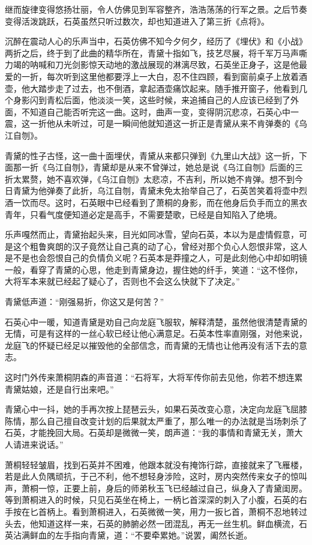 继而旋律变得悠扬壮丽，令人仿佛见到军容整齐，浩浩荡荡的行军之景。之后节奏变得活泼跳跃，石英虽然只听过数次，却也知道进入了第三折《点将》。

沉醉在震动人心的乐声当中，石英仿佛不知今夕何夕，经历了《埋伏》和《小战》两折之后，终于到了此曲的精华所在，青黛十指如飞，技艺尽展，将千军万马声嘶力竭的呐喊和刀光剑影惊天动地的激战展现的淋漓尽致，石英坐正身子，这是他最爱的一折，每次听到这里他都要浮上一大白，忍不住四顾，看到窗前桌子上放着酒壶，他大踏步走了过去，也不倒酒，拿起酒壶痛饮起来。随手推开窗子，他看到几个身影闪到青松后面，他淡淡一笑，这些时候，来追捕自己的人应该已经到了外面，不知道自己能否听完这一曲。这时，曲声一变，变得阴沉悲凉，石英心中一震，这一折他从未听过，可是一瞬间他就知道这一折正是青黛从来不肯弹奏的《乌江自刎》。

青黛的性子古怪，这一曲十面埋伏，青黛从来都只弹到《九里山大战》这一折，下面那一折《乌江自刎》，青黛却是从来不曾弹过，她总是说《乌江自刎》后面的三折太累赘，她不喜欢弹，《乌江自刎》太悲凉，不吉利，所以她不肯弹。想不到今日青黛为他弹奏了此折，乌江自刎，青黛未免太抬举自己了，石英苦笑着将壶中烈酒一饮而尽。这时，石英眼中已经看到了萧桐的身影，而在他身后负手而立的黑衣青年，只看气度便知道必定是高手，不需要楚歌，已经是自知陷入了绝境。

乐声嘎然而止，青黛抬起头来，目光如同冰雪，望向石英，本以为是虚情假意，可是这个粗鲁爽朗的汉子竟然让自己真的动了心，曾经对那个负心人怨恨非常，这人是不是也会怨恨自己的负情负义呢？石英本是莽撞之人，可是此刻他心中却如明镜一般，看穿了青黛的心思，他走到青黛身边，握住她的纤手，笑道：“这不怪你，大将军本来就已经起了疑心了，否则也不会这么快就下了决定。”

青黛低声道：“刚强易折，你这又是何苦？”

石英心中一暖，知道青黛是劝自己向龙庭飞服软，解释清楚，虽然他很清楚青黛的无情，可是有这样的一丝心软已经让他心满意足。石英本性率直刚强，对他来说，龙庭飞的怀疑已经足以摧毁他的全部信念，而青黛的无情也让他再没有活下去的意志。

这时门外传来萧桐阴森的声音道：“石将军，大将军传你前去见他，你若不想连累青黛姑娘，还是自行出来吧。”

青黛心中一抖，她的手再次按上琵琶云头，如果石英改变心意，决定向龙庭飞屈膝陈情，那么自己擅自改变计划的后果就太严重了，那么唯一的办法就是当场刺杀了石英，才能挽回大局。石英却是微微一笑，朗声道：“我的事情和青黛无关，萧大人请进来说话。”

萧桐轻轻皱眉，找到石英并不困难，他跟本就没有掩饰行踪，直接就来了飞雁楼，若是此人负隅顽抗，于己不利，他不想轻身涉险，这时，房内突然传来女子的惊叫声，萧桐一惊，正要上前，身后的师弟秋玉飞已经越过自己，纵身入了青黛闺房。等到萧桐进入的时候，只见石英坐在椅上，一柄匕首深深的刺入了小腹，石英的右手按在匕首柄上。看到萧桐进入，石英微微一笑，用力一扳匕首，萧桐不忍地转过头去，他知道这样一来，石英的肺腑必然一团混乱，再无一丝生机。鲜血横流，石英沾满鲜血的左手指向青黛，道：“不要牵累她。”说罢，阖然长逝。

